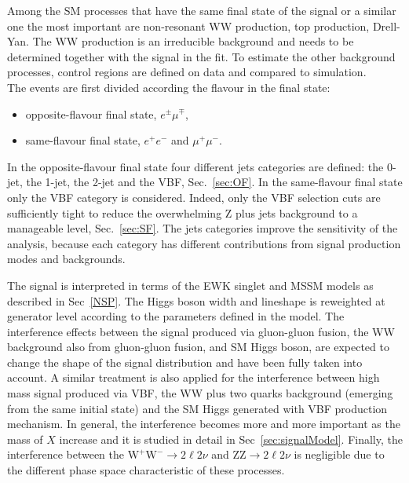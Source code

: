 Among the SM processes that have the same final state of the signal or a similar one the most important are non-resonant WW production, top production, Drell-Yan. The WW production is an irreducible background and needs to be determined together with the signal in the fit. To estimate the other background processes, control regions are defined on data and compared to simulation. \\
The events are first divided according the flavour in the final state: 
\begin{itemize}
\item opposite-flavour final state, $e^{\pm} \mu^{\mp}$,
\item same-flavour final state, $e^+ e^-$ and  $\mu^+ \mu^-$. 
\end{itemize}
In the opposite-flavour final state four different jets categories are defined: the 0-jet, the 1-jet, the 2-jet and the VBF, Sec.~\ref{sec:OF}. 
In the same-flavour final state only the VBF category is considered. Indeed, only the VBF selection cuts are sufficiently tight to reduce the  overwhelming Z plus jets background to a manageable level, Sec.~\ref{sec:SF}. The jets categories improve the sensitivity of the analysis, because each category has different contributions from signal production modes and backgrounds.

The signal is interpreted in terms of the EWK singlet and MSSM models as described in Sec~\ref{NSP}. The Higgs boson width and lineshape is reweighted at generator level according to the parameters defined in the model. The interference effects between the signal produced via gluon-gluon fusion, the WW background also from gluon-gluon fusion, and SM Higgs boson, are expected to change the shape of the signal distribution and have been fully taken into account. 
A similar treatment is also applied for the interference between high mass signal produced via VBF, the WW plus two quarks background (emerging from the same initial state) and the SM Higgs generated with VBF production mechanism. In general, the interference becomes more and more important as the mass of $X$ increase and it is studied in detail in Sec~\ref{sec:signalModel}.
Finally, the interference between the $\mathrm{W^+W^-}\to2\ell2\nu$ and $\mathrm{ZZ}\to2\ell2\nu$ is negligible due to the different phase space characteristic of these processes.





